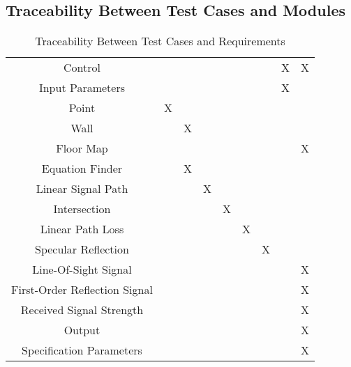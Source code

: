 \documentclass[12pt, titlepage]{article}
\begin{document}
\newpage
\begin{landscape}
\subsection{Traceability Between Test Cases and Modules}
\begin{table}[h!]
	\centering
	\begin{tabular}{|c|c|c|c|c|c|c|c|c|}
		\hline
		& \nameref{Point} & \nameref{wall} & \nameref{LP} & \nameref{intersection} & \nameref{ll} & \nameref{specular} & \nameref{Ainput} & \nameref{Aoutput} \\
		\hline
		Control    			& & & & & & &X&X\\ \hline
		Input Parameters   	& & & & & & &X& \\ \hline
		Point     			&X& & & & & & & \\ \hline
		Wall			 	& &X& & & & & & \\ \hline
		Floor Map	     	& & & & & & & &X\\ \hline
		Equation Finder	    & &X& & & & & & \\ \hline
		Linear Signal Path	& & &X& & & & & \\ \hline
		Intersection		& & & &X& & & & \\ \hline
		Linear Path Loss	& & & & &X& & & \\ \hline
		Specular Reflection & & & & & &X& & \\ \hline
		Line-Of-Sight Signal& & & & & & & &X\\ \hline
		First-Order Reflection Signal & & & & & & & &X\\ \hline
		Received Signal Strength & & & & & & & &X\\ \hline
		Output 				& & & & & & & &X\\ \hline
		Specification Parameters & & & & & & & &X\\ \hline
	\end{tabular}
	\caption{Traceability Between Test Cases and Requirements}
	\label{Table:A_trace}
\end{table}
\end{landscape}





\newpage
\end{document}
